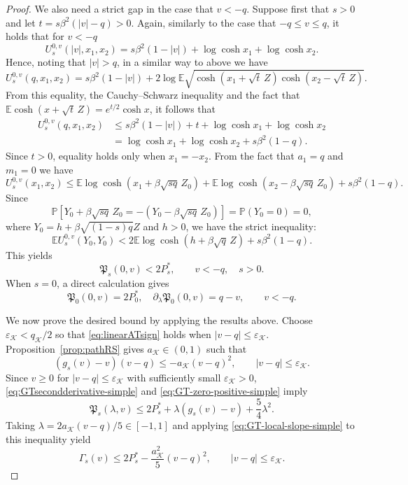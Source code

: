 \documentclass[11pt]{article}
\numberwithin{equation}{section}
\newcommand{\E}{\mathbb{E}}
\newcommand{\Pbb}{\mathbb{P}}
\newcommand{\1}{\mathbf 1}
\newcommand{\cK}{\mathcal K}
\begin{document}
\begin{proof}
We also need a strict gap in the case that $v<-q$.  Suppose first that $s>0$ and let $t=s\beta^2(|v|-q)>0$.
Again, similarly to the case that $-q\le v\le q$, it holds that for $v< -q$
\[
 U_s^{0,v}(|v|,x_1,x_2)
 =s\beta^2(1-|v|)+\log\cosh x_1+\log\cosh x_2.
\]
Hence, noting that $|v|>q$, in a similar way to above we have
\[
 U_s^{0,v}(q,x_1,x_2)
 =
 s\beta^2(1-|v|)
 +2\log\E\sqrt{
   \cosh(x_1+\sqrt t\,Z)\cosh(x_2-\sqrt t\,Z)}.
\]
From this equality, the Cauchy--Schwarz inequality and the fact that $\E\cosh(x+\sqrt t\,Z)=e^{t/2}\cosh x$, it follows that
\begin{align*}
 U_s^{0,v}(q,x_1,x_2)
 &\le
 s\beta^2(1-|v|)+t
 +\log\cosh x_1+\log\cosh x_2\\
 &=\log\cosh x_1+\log\cosh x_2 + s\beta^2(1-q).
\end{align*}
Since $t>0$, equality holds only when $x_1=-x_2$.
From the fact that $a_1=q$ and $m_1=0$ we have
\[
U_s^{0,v}(x_1,x_2) \le \E \log\cosh (x_1 +\beta\sqrt{sq}\,Z_0) + \E \log\cosh (x_2-\beta\sqrt{sq}\,Z_0) + s\beta^2(1-q).
\]
Since 
\[
\Pbb \left[ Y_0+\beta\sqrt{sq}\,Z_0 = - (Y_0-\beta\sqrt{sq}\,Z_0 ) \right] =\Pbb(Y_0=0) = 0,
\]
where $Y_0 = h +\beta \sqrt{(1-s)q}Z$ and $h>0$, we have the strict inequality:
\[
\E U_s^{0,v}(Y_0,Y_0) < 2 \E \log\cosh (h +\beta\sqrt{q}\,Z) + s\beta^2(1-q) .
\]
This yields
\begin{equation}
 \mathfrak P_s(0,v)<2P_s^*,
 \qquad v<-q,\quad s>0.
 \label{eq:GT-negative-strict-simple}
\end{equation}
When $s=0$, a direct calculation gives
\begin{equation}
 \mathfrak P_0(0,v)=2P_0^*,
 \quad
 \partial_\lambda\mathfrak P_0(0,v)=q-v, \qquad v<-q.
 \label{eq:GT-szero-simple}
\end{equation}

We now prove the desired bound by applying the results above.
Choose
$\varepsilon_{\cK}<q_{\cK}/2$ so that
\eqref{eq:linearATsign} holds when
$|v-q|\le\varepsilon_{\cK}$.  Proposition~\ref{prop:pathRS} gives
$a_{\cK}\in (0,1)$ such that %
\begin{equation}
 (g_s(v)-v)(v-q)
 \le-a_{\cK}(v-q)^2,
 \qquad |v-q|\le\varepsilon_{\cK}.
 \label{eq:GT-local-slope-simple}
\end{equation}
Since $v\geq 0$ for $|v-q|\le\varepsilon_{\cK}$ with sufficiently small $\varepsilon_{\cK} >0$, \eqref{eq:GTsecondderivative-simple} and \eqref{eq:GT-zero-positive-simple} imply
\[
 \mathfrak P_s(\lambda,v)
 \le
 2P_s^*+\lambda(g_s(v)-v)
 +\frac{5}4 \lambda^2.
\]
Taking $\lambda=2 a_{\cK}(v-q)/5 \in [-1,1]$ and applying \eqref{eq:GT-local-slope-simple} to this inequality yield
\begin{equation}
 \Gamma_s(v)
 \le
 2P_s^*
 -\frac{a_{\cK}^2}{5}(v-q)^2,
 \qquad |v-q|\le\varepsilon_{\cK}.
 \label{eq:GT-local-coercivity-simple}
\end{equation}


\end{proof}
\end{document}
